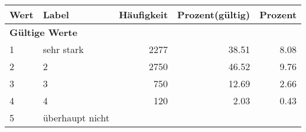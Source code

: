      \begin{longtable}{lXrrr}
     \toprule
     \textbf{Wert} & \textbf{Label} & \textbf{Häufigkeit} & \textbf{Prozent(gültig)} & \textbf{Prozent} \\
     \endhead
     \midrule
     \multicolumn{5}{l}{\textbf{Gültige Werte}}\\

     1 &
     \multicolumn{1}{X}{ sehr stark   } &


       \num{2277} &
       \num[round-mode=places,round-precision=2]{38.51} &
         \num[round-mode=places,round-precision=2]{8.08} \\

     2 &
     \multicolumn{1}{X}{ 2   } &


       \num{2750} &
       \num[round-mode=places,round-precision=2]{46.52} &
         \num[round-mode=places,round-precision=2]{9.76} \\

     3 &
     \multicolumn{1}{X}{ 3   } &


       \num{750} &
       \num[round-mode=places,round-precision=2]{12.69} &
         \num[round-mode=places,round-precision=2]{2.66} \\

     4 &
     \multicolumn{1}{X}{ 4   } &


       \num{120} &
       \num[round-mode=places,round-precision=2]{2.03} &
         \num[round-mode=places,round-precision=2]{0.43} \\

     5 &
     \multicolumn{1}{X}{ überhaupt nicht   } &



\end{longtable}
